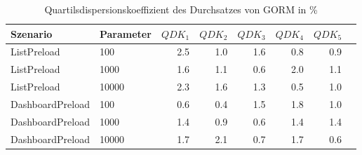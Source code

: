 
\begin{table}[ht]
\setlength{\extrarowheight}{-1pt}
\centering
\caption{Quartilsdispersionskoeffizient des Durchsatzes von GORM in \%}
\begin{tabular}{llrrrrrr}
\toprule
Szenario & Parameter & ${QDK_1}$ & ${QDK_2}$ & ${QDK_3}$& ${QDK_4}$ & ${QDK_5}$ \\
\midrule
	ListPreload & 100 & \cellcolor{red!11}  2.5 &  1.0 &  1.6 &  0.8 &  0.9 \\
	ListPreload & 1000 &  1.6 &  1.1 &  0.6 & \cellcolor{red!11}  2.0 &  1.1 \\
	ListPreload & 10000 & \cellcolor{red!11}  2.3 &  1.6 &  1.3 &  0.5 &  1.0 \\
	DashboardPreload & 100 &  0.6 &  0.4 &  1.5 &  1.8 &  1.0 \\
	DashboardPreload & 1000 &  1.4 &  0.9 &  0.6 &  1.4 &  1.4 \\
	DashboardPreload & 10000 &  1.7 & \cellcolor{red!11}  2.1 &  0.7 &  1.7 &  0.6 \\
\bottomrule
\end{tabular}
\label{tab:quartilsdispersionskoeffizient_durchsatz_gorm}
\end{table}
	